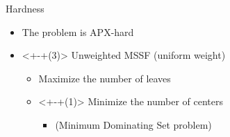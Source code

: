 \begin{frame}{Hardness}
\begin{itemize}
	\item<+> The problem is APX-hard
	\item<+-+(3)> Unweighted MSSF (uniform weight)
	\begin{itemize}
	  \item<+> Maximize the number of leaves 
	  \item<+-+(1)> Minimize the number of centers 
		\begin{itemize}
		  \item<+> (Minimum Dominating Set problem)
		\end{itemize}
	\end{itemize}
\end{itemize}

\vfill

\centering


\end{frame}